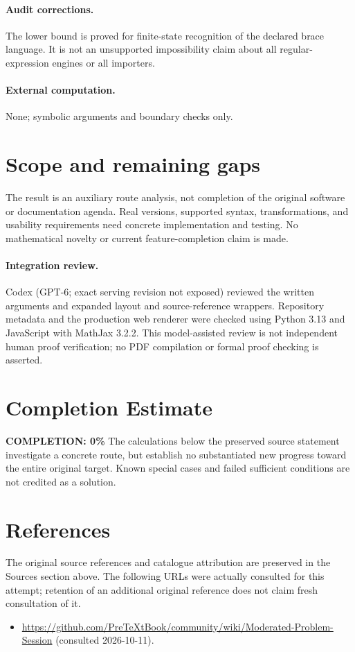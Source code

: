 \documentclass[11pt]{article}
\begin{document}
\paragraph{Audit corrections.} The lower bound is proved for finite-state recognition of the declared brace language. It is not an unsupported impossibility claim about all regular-expression engines or all importers.
\paragraph{External computation.} None; symbolic arguments and boundary checks only.
\section{Scope and remaining gaps}
The result is an auxiliary route analysis, not completion of the original software or documentation agenda. Real versions, supported syntax, transformations, and usability requirements need concrete implementation and testing. No mathematical novelty or current feature-completion claim is made.
\paragraph{Integration review.} Codex (GPT-6; exact serving revision not exposed) reviewed the written arguments and expanded layout and source-reference wrappers. Repository metadata and the production web renderer were checked using Python 3.13 and JavaScript with MathJax 3.2.2. This model-assisted review is not independent human proof verification; no PDF compilation or formal proof checking is asserted.

\section{Completion Estimate}
\noindent\textbf{COMPLETION: 0\%}
The calculations below the preserved source statement investigate a concrete route,
but establish no substantiated new progress toward the entire original target.
Known special cases and failed sufficient conditions are not credited as a solution.
\section{References}
The original source references and catalogue attribution are preserved in the
Sources section above. The following URLs were actually consulted for this attempt;
retention of an additional original reference does not claim fresh consultation of it.
\begin{itemize}
\item \url{https://github.com/PreTeXtBook/community/wiki/Moderated-Problem-Session} (consulted 2026-10-11). 
\end{itemize}
\end{document}
